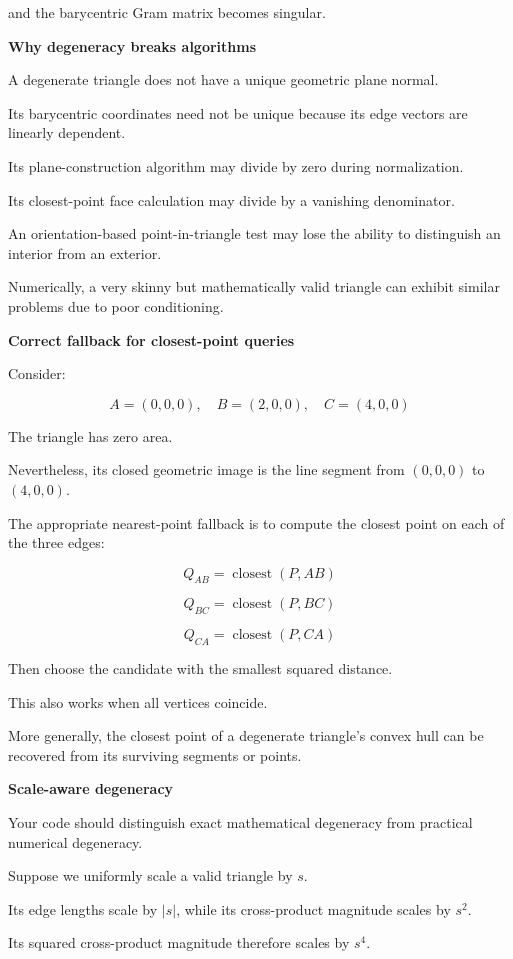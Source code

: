 and the barycentric Gram matrix becomes singular.

\textbf{Why degeneracy breaks algorithms}

A degenerate triangle does not have a unique geometric plane normal.

Its barycentric coordinates need not be unique because its edge vectors are linearly dependent.

Its plane-construction algorithm may divide by zero during normalization.

Its closest-point face calculation may divide by a vanishing denominator.

An orientation-based point-in-triangle test may lose the ability to distinguish an interior from an exterior.

Numerically, a very skinny but mathematically valid triangle can exhibit similar problems due to poor conditioning.

\textbf{Correct fallback for closest-point queries}

Consider:

\[
A=(0,0,0),\quad B=(2,0,0),\quad C=(4,0,0)
\]

The triangle has zero area.

Nevertheless, its closed geometric image is the line segment from \((0,0,0)\) to \((4,0,0)\).

The appropriate nearest-point fallback is to compute the closest point on each of the three edges:

\[
Q_{AB}=\operatorname{closest}(P,AB)
\]

\[
Q_{BC}=\operatorname{closest}(P,BC)
\]

\[
Q_{CA}=\operatorname{closest}(P,CA)
\]

Then choose the candidate with the smallest squared distance.

This also works when all vertices coincide.

More generally, the closest point of a degenerate triangle's convex hull can be recovered from its surviving segments or points.

\textbf{Scale-aware degeneracy}

Your code should distinguish exact mathematical degeneracy from practical numerical degeneracy.

Suppose we uniformly scale a valid triangle by \(s\).

Its edge lengths scale by \(|s|\), while its cross-product magnitude scales by \(s^2\).

Its squared cross-product magnitude therefore scales by \(s^4\).

